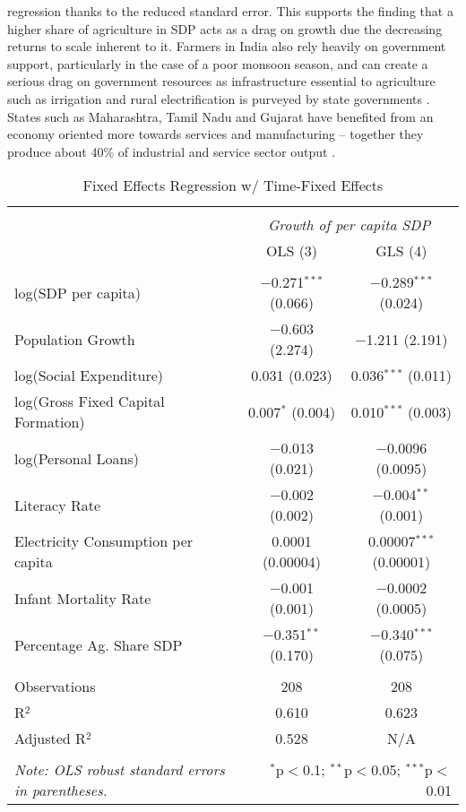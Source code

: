 \documentclass[a4paper, 11pt]{article}
\begin{document}
regression thanks to the reduced standard error.  This supports the finding that a higher share of agriculture in SDP acts as a drag on growth due the decreasing returns to scale inherent to it.  Farmers in India also rely heavily on government support, particularly in the case of a poor monsoon season, and can create a serious drag on government resources as infrastructure essential to agriculture such as irrigation and rural electrification is purveyed by state governments \citep{ahluwalia_state-level_2000}.  States such as Maharashtra, Tamil Nadu and Gujarat have benefited from an economy oriented more towards services and manufacturing -- together they produce about 40\% of industrial and service sector output \citep{purfield_mind_2006}.\par

\begin{table}[!htbp] \centering 
  \caption{Fixed Effects Regression w/ Time-Fixed Effects} 
  \label{} 
\begin{tabular}{@{\extracolsep{5pt}}lcc} 
\\[-1.8ex]\hline 
\hline \\[-1.8ex] 
 & \multicolumn{2}{c}{\textit{Growth of per capita SDP}} \\ 
 & OLS (3) & GLS (4) \\ 
\hline \\[-1.8ex]
 log(SDP per capita) & $-$0.271$^{***}$ (0.066) & $-$0.289$^{***}$ (0.024) \\  
  Population Growth & $-$0.603 (2.274) & $-$1.211 (2.191) \\ 
  log(Social Expenditure) & 0.031 (0.023) & 0.036$^{***}$ (0.011) \\ 
  log(Gross Fixed Capital Formation) & 0.007$^{*}$ (0.004) & 0.010$^{***}$ (0.003) \\ 
  log(Personal Loans) & $-$0.013 (0.021) & $-$0.0096 (0.0095) \\ 
  Literacy Rate & $-$0.002 (0.002) & $-$0.004$^{**}$ (0.001) \\ 
  Electricity Consumption per capita & 0.0001 (0.00004) & 0.00007$^{***}$ (0.00001) \\ 
  Infant Mortality Rate & $-$0.001 (0.001) & $-$0.0002 (0.0005) \\ 
  Percentage Ag. Share SDP & $-$0.351$^{**}$ (0.170) & $-$0.340$^{***}$ (0.075) \\ 
 \hline \\[-1.8ex] 
Observations & 208 & 208 \\ 
R$^{2}$ & 0.610 & 0.623 \\ 
Adjusted R$^{2}$ & 0.528 & N/A \\ 
\hline 
\hline \\[-1.8ex] 
\textit{Note: OLS robust standard errors in parentheses.}  & \multicolumn{2}{r}{$^{*}$p$<$0.1; $^{**}$p$<$0.05; $^{***}$p$<$0.01} \\ 
\end{tabular} 
\end{table} 
\end{document}
